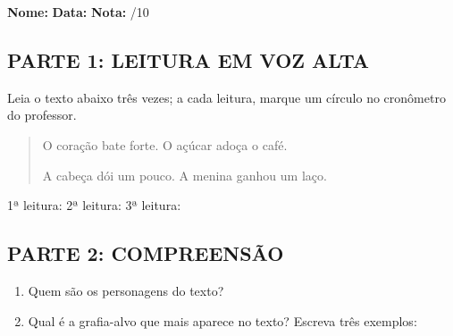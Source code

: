 \begin{exercicio}

\noindent\textbf{Nome:} \underline{\hspace{3.2cm}} \quad \textbf{Data:} \underline{\hspace{1.6cm}} \quad \textbf{Nota:} \underline{\hspace{0.9cm}}/10


\subsection*{PARTE 1: LEITURA EM VOZ ALTA}

Leia o texto abaixo três vezes; a cada leitura, marque um círculo no cronômetro do professor.

\begin{quote}
O coração bate forte. O açúcar adoça o café.

A cabeça dói um pouco. A menina ganhou um laço.
\end{quote}

\begin{center}
1ª leitura: \underline{\hspace{1.5cm}} \quad 2ª leitura: \underline{\hspace{1.5cm}} \quad 3ª leitura: \underline{\hspace{1.5cm}}
\end{center}

\subsection*{PARTE 2: COMPREENSÃO}

\begin{enumerate}

  \item Quem são os personagens do texto?
  \begin{center}
  \underline{\hspace{12cm}}
  \end{center}

  \item Qual é a grafia-alvo que mais aparece no texto? Escreva três exemplos:
  \begin{center}
  \underline{\hspace{3.5cm}} \quad \underline{\hspace{3.5cm}} \quad \underline{\hspace{3.5cm}}
  \end{center}


\end{enumerate}
\end{exercicio}
